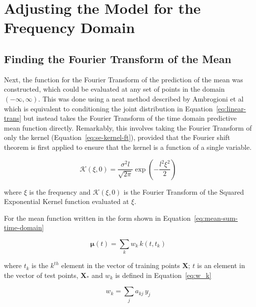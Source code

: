 \documentclass[12pt]{article}
\begin{document}
    \section{Adjusting the Model for the Frequency Domain}

    \subsection{Finding the Fourier Transform of the Mean}
    Next, the function for the Fourier Transform of the prediction of the mean was constructed, which could be evaluated at any set of points in the domain $(-\infty, \infty)$.
    This was done using a neat method described by Ambrogioni et al~\cite{Ambrogioni2018} which is equivalent to conditioning the joint distribution in Equation~\ref{eq:linear-trans} but instead takes the Fourier Transform of the time domain predictive mean function directly.
    Remarkably, this involves taking the Fourier Transform of only the kernel (Equation~\ref{eq:se-kernel-ft}), provided that the Fourier shift theorem is first applied to ensure that the kernel is a function of a single variable.

    \begin{equation}
        \mathcal{K}(\xi,0) = \frac{\sigma^2 l}{\sqrt{2 \pi}} \exp\left(-\frac{l^2 \xi^2}{2}\right) \label{eq:se-kernel-ft}
    \end{equation}

    \noindent where $\xi$ is the frequency and $\mathcal{K}(\xi,0)$ is the Fourier Transform of the Squared Exponential Kernel function evaluated at $\xi$.

    For the mean function written in the form shown in Equation~\ref{eq:mean-sum-time-domain}

    \begin{equation}
        \mathbf{\mu}(t) = \sum_{k} w_k \, k(t,t_k) \label{eq:mean-sum-time-domain}
    \end{equation}

    \noindent where $t_k$ is the $k^{th}$ element in the vector of training points $\mathbf{X}$; $t$ is an element in the vector of test points, $\mathbf{X}_*$ and $w_k$ is defined in Equation~\ref{eq:w_k}

    \begin{equation}
        w_k = \sum_{j} a_{kj} \, y_j \label{eq:w_k}
    \end{equation}
\end{document}
